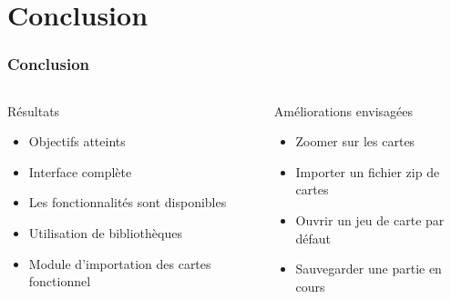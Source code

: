 \documentclass[11pt]{beamer}
\begin{document}
\section{Conclusion}
\begin{frame}
\frametitle{Conclusion}
\begin{columns}[b]
\begin{column}{5.8cm}
\begin{block}{Résultats}
\begin{itemize}
\item Objectifs atteints
\item Interface complète
\item Les fonctionnalités sont disponibles 
\item Utilisation de bibliothèques
\item Module d'importation des cartes fonctionnel
\end{itemize}
\end{block}
\end{column}
\begin{column}{5.8cm}
\begin{block}{Améliorations envisagées}
\begin{itemize}
\item Zoomer sur les cartes
\item Importer un fichier zip de cartes
\item Ouvrir un jeu de carte par défaut
\item Sauvegarder une partie en cours
\end{itemize}
\end{block}
\end{column}
\end{columns}
\end{frame}
\end{document}
